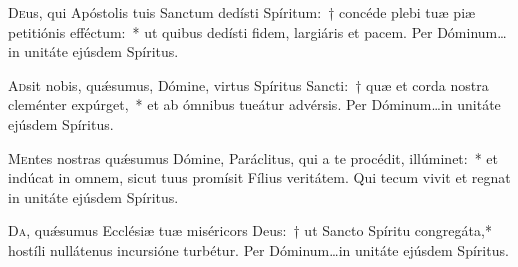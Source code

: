 \documentclass[vesperale_romanum.tex]{subfiles}
\begin{document}
\oratio

\lettrine{D}{e}us, qui Apóstolis tuis Sanctum dedísti Spíritum:~† concéde plebi tuæ piæ petitiónis efféctum:~* ut quibus dedísti fidem, largiáris et pacem.
Per Dóminum…in unitáte ejúsdem Spíritus.



\oratio

\lettrine{A}{d}sit nobis, quǽsumus, Dómine, virtus Spíritus Sancti:~† quæ et corda nostra cleménter expúrget,~* et ab ómnibus tueátur advérsis. Per Dóminum…in unitáte ejúsdem Spíritus.




\oratio

\lettrine{M}{e}ntes nostras quǽsumus Dómine, Paráclitus, qui a te procédit, illúminet:~* et indúcat in omnem, sicut tuus promísit Fílius veritátem. Qui tecum vivit et regnat in unitáte ejúsdem Spíritus.








\oratio

\lettrine{D}{a}, quǽsumus Ecclésiæ tuæ miséricors Deus:~† ut Sancto Spíritu congregáta,* hostíli nullátenus incursióne turbétur. Per Dóminum…in unitáte ejúsdem Spíritus.

\biggerrule
         
\end{document}
